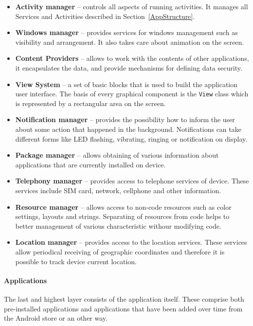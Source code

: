 \begin{itemize}
\item \textbf{Activity manager} -- controls all aspects of running activities. It manages all Services and Activities  described in Section~\ref{AppStructure}.
\item \textbf{Windows manager} -- provides services for windows management such as visibility and arrangement. It also takes care about animation on the screen.
\item \textbf{Content Providers} -- allows to work with the contents of other applications, it encapsulates the data, and provide mechanisms for defining data security.
\item \textbf{View System} -- a set of basic blocks that is used to build the application user interface. The basis of every graphical component is the \texttt{View} class which is represented by a rectangular area on the screen.
\item \textbf{Notification manager} -- provides the possibility how to inform the user about some action that happened in the background. Notifications can take different forms like LED flashing, vibrating, ringing or notification on display.
\item \textbf{Package manager} -- allows obtaining of various information about applications that are currently installed on device.
\item \textbf{Telephony manager} -- provides access to telephone services of device. These services include SIM card, network, cellphone and other information.
\item \textbf{Resource manager} -- allows access to non-code resources such as color settings, layouts and strings. Separating of resources from code helps to better management of various characteristic withour modifying code.
\item \textbf{Location manager} -- provides access to the location services. These services allow periodical receiving of geographic coordinates and therefore it is possible to track device current location.
\end{itemize}

\paragraph{Applications}
The last and highest layer consists of the application itself. These comprise both pre-installed applications and applications that have been added over time from the Android store or an other way.

